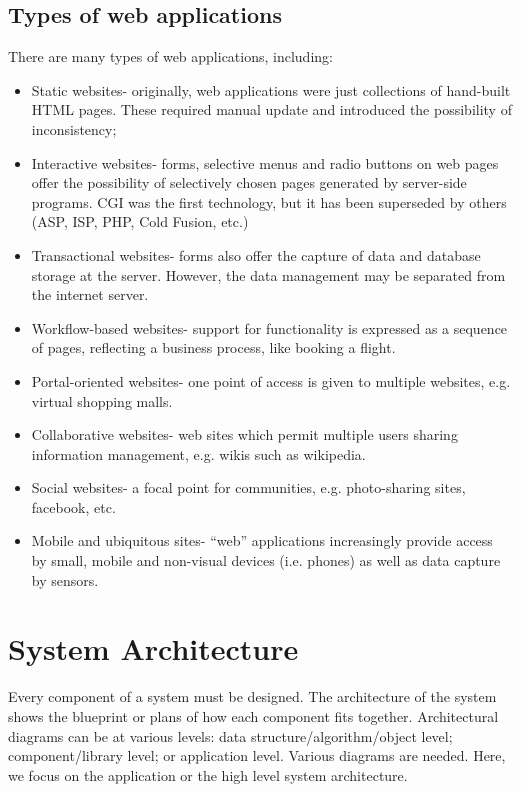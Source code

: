 \documentclass[a4paper, openany]{memoir}
\begin{document}
\subsection{Types of web applications}
There are many types of web applications, including:
\begin{itemize}
    \item Static websites- originally, web applications were just collections of hand-built HTML pages. These required manual update and introduced the possibility of inconsistency;
    \item Interactive websites- forms, selective menus and radio buttons on web pages offer the possibility of selectively chosen pages generated by server-side programs. CGI was the first technology, but it has been superseded by others (ASP, ISP, PHP, Cold Fusion, etc.)
    \item Transactional websites- forms also offer the capture of data and database storage at the server. However, the data management may be separated from the internet server.
    \item Workflow-based websites- support for functionality is expressed as a sequence of pages, reflecting a business process, like booking a flight.
    \item Portal-oriented websites- one point of access is given to multiple websites, e.g. virtual shopping malls.
    \item Collaborative websites- web sites which permit multiple users sharing information management, e.g. wikis such as wikipedia.
    \item Social websites- a focal point for communities, e.g. photo-sharing sites, facebook, etc.
    \item Mobile and ubiquitous sites- ``web'' applications increasingly provide access by small, mobile and non-visual devices (i.e. phones) as well as data capture by sensors.
\end{itemize}
\newpage

\section{System Architecture}
Every component of a system must be designed. The architecture of the system shows the blueprint or plans of how each component fits together. Architectural diagrams can be at various levels: data structure/algorithm/object level; component/library level; or application level. Various diagrams are needed. Here, we focus on the application or the high level system architecture.
\end{document}
